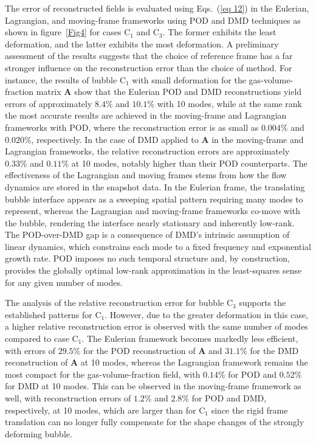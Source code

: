 \documentclass[a4paper,fleqn]{cas-sc}
\begin{document}
	The error of reconstructed fields is evaluated using Eqs.~(\ref{eq 12}) in the Eulerian, Lagrangian, and moving-frame frameworks using POD and DMD techniques as shown in figure~\ref{Fig4} for cases C$_1$ and C$_3$. The former exhibits the least deformation, and the latter exhibits the most deformation. A preliminary assessment of the results suggests that the choice of reference frame has a far stronger influence on the reconstruction error than the choice of method. For instance, the results of bubble C$_1$ with small deformation for the gas-volume-fraction matrix $\mathbf{A}$ show that the Eulerian POD and DMD reconstructions yield errors of approximately $8.4\%$ and $10.1\%$ with 10 modes, while at the same rank the most accurate results are achieved in the moving-frame and Lagrangian frameworks with POD, where the reconstruction error is as small as $0.004\%$ and $0.020\%$, respectively. In the case of DMD applied to $\mathbf{A}$ in the moving-frame and Lagrangian frameworks, the relative reconstruction errors are approximately $0.33\%$ and $0.11\%$ at 10 modes, notably higher than their POD counterparts. The effectiveness of the Lagrangian and moving frames stems from how the flow dynamics are stored in the snapshot data. In the Eulerian frame, the translating bubble interface appears as a sweeping spatial pattern requiring many modes to represent, whereas the Lagrangian and moving-frame frameworks co-move with the bubble, rendering the interface nearly stationary and inherently low-rank. The POD-over-DMD gap is a consequence of DMD's intrinsic assumption of linear dynamics, which constrains each mode to a fixed frequency and exponential growth rate. POD imposes no such temporal structure and, by construction, provides the globally optimal low-rank approximation in the least-squares sense for any given number of modes.
	
	The analysis of the relative reconstruction error for bubble C$_3$ supports the established patterns for C$_1$. However, due to the greater deformation in this case, a higher relative reconstruction error is observed with the same number of modes compared to case C$_1$. The Eulerian framework becomes markedly less efficient, with errors of $29.5\%$ for the POD reconstruction of $\mathbf{A}$ and $31.1\%$ for the DMD reconstruction of $\mathbf{A}$ at 10 modes, whereas the Lagrangian framework remains the most compact for the gas-volume-fraction field, with $0.14\%$ for POD and $0.52\%$ for DMD at 10 modes. This can be observed in the moving-frame framework as well, with reconstruction errors of $1.2\%$ and $2.8\%$ for POD and DMD, respectively, at 10 modes, which are larger than for C$_1$ since the rigid frame translation can no longer fully compensate for the shape changes of the strongly deforming bubble.
	
\end{document}
